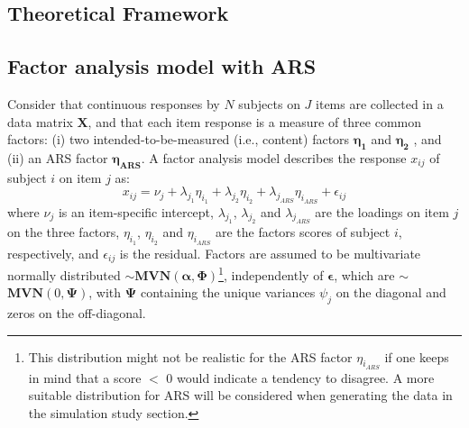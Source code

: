 \documentclass[a4paper,man,natbib]{apa6}
\begin{document}
\begin{linenumbers}
\section{Theoretical Framework}
\subsection{Factor analysis model with ARS}
Consider that continuous responses by $N$ subjects on $J$ items are collected in a data matrix $\textbf{X}$, and that each item response is a measure of three common factors: (i) two intended-to-be-measured (i.e., content) factors $\boldsymbol{\eta_{1}}$ and $\boldsymbol{\eta_{2}}$ , and (ii) an ARS factor $\boldsymbol{\eta_{ARS}}$. A factor analysis model describes the response $x_{ij}$ of subject $i$ on item $j$ as:
\begin{equation}
x_{ij} = \nu_{j} + \lambda_{j_{1}}\eta_{i_{1}}  + \lambda_{j_{2}}\eta_{i_{2}} + \lambda_{j_{ARS}}\eta_{i_{ARS}} + \epsilon_{ij}
\end{equation}
where $\nu_{j}$ is an item-specific intercept, $\lambda_{j_{1}}$, $\lambda_{j_{2}}$ and $\lambda_{j_{ARS}}$ are the loadings on item $j$ on the three factors, $\eta_{i_{1}}$, $\eta_{i_{2}}$ and $\eta_{i_{ARS}}$ are the factors scores of subject $i$, respectively, and $\epsilon_{ij}$ is the residual. Factors are assumed to be multivariate normally distributed $\sim$$\textbf{MVN}(\boldsymbol{\alpha}, \boldsymbol{\Phi})$\footnote{This distribution might not be realistic for the ARS factor $\eta_{i_{ARS}}$ if one keeps in mind that a score $<$ 0 would indicate a tendency to disagree. A more suitable distribution for ARS will be considered when generating the data in the simulation study section.}, independently of $\boldsymbol{\epsilon}$, which are $\sim$$\textbf{MVN}(0, \boldsymbol{\Psi})$, with $\boldsymbol{\Psi}$ containing the unique variances $\psi_{j}$ on the diagonal and zeros on the off-diagonal. 


\end{linenumbers}
\end{document}
